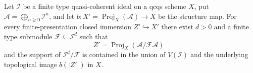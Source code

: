 \begin{lemma}
  \label{lemma:nagata-proj-closed-center-finite-degree-exists}

  Let $\mathcal I$ be a finite type quasi-coherent ideal on a qcqs scheme
  $X$, put $\mathcal A=\bigoplus_{n\geq0}\mathcal I^n$, and let
  $b\colon X'=\operatorname{Proj}_X(\mathcal A)\to X$ be the structure map.
  For every finite-presentation
  closed immersion $Z'\hookrightarrow X'$ there exist $d>0$ and a finite type
  submodule $\mathcal F\subseteq\mathcal I^d$ such that
  \[
    Z'=\operatorname{Proj}_X(\mathcal A/\mathcal F\mathcal A)
  \]
  and the support of $\mathcal I^d/\mathcal F$ is contained in the union of
  $V(\mathcal I)$ and the underlying topological image $b(|Z'|)$ in $X$.
\end{lemma}


